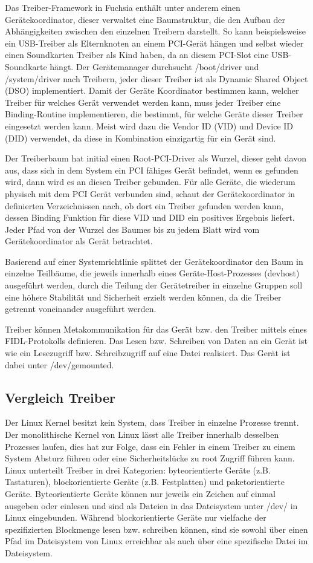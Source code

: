 \documentclass[a4paper]{scrartcl}
\begin{document}
Das Treiber-Framework in Fuchsia enthält unter anderem einen Gerätekoordinator, dieser verwaltet eine Baumstruktur, die den Aufbau der Abhängigkeiten zwischen den einzelnen Treibern darstellt. So kann beispielsweise ein USB-Treiber als Elternknoten an einem PCI-Gerät hängen und selbst wieder einen Soundkarten Treiber als Kind haben, da an diesem PCI-Slot eine USB-Soundkarte hängt. Der Gerätemanager durchsucht /boot/driver und /system/driver nach Treibern, jeder dieser Treiber ist als Dynamic Shared Object (DSO) implementiert. Damit der Geräte Koordinator bestimmen kann, welcher Treiber für welches Gerät verwendet werden kann, muss jeder Treiber eine Binding-Routine implementieren, die bestimmt, für welche Geräte dieser Treiber eingesetzt werden kann. Meist wird dazu die Vendor ID (VID) und Device ID (DID) verwendet, da diese in Kombination einzigartig für ein Gerät sind. 

Der Treiberbaum hat initial einen Root-PCI-Driver als Wurzel, dieser geht davon aus, dass sich in dem System ein PCI fähiges Gerät befindet, wenn es gefunden wird, dann wird es an diesen Treiber gebunden. Für alle Geräte, die wiederum physisch mit dem PCI Gerät verbunden sind, schaut der Gerätekoordinator in definierten Verzeichnissen nach, ob dort ein Treiber gefunden werden kann, dessen Binding Funktion für diese VID und DID ein positives Ergebnis liefert. Jeder Pfad von der Wurzel des Baumes bis zu jedem Blatt wird vom Gerätekoordinator als Gerät betrachtet.

Basierend auf einer Systemrichtlinie splittet der Gerätekoordinator den Baum in einzelne Teilbäume, die jeweils innerhalb eines Geräte-Host-Prozesses (devhost) ausgeführt werden, durch die Teilung der Gerätetreiber in einzelne Gruppen soll eine höhere Stabilität und Sicherheit erzielt werden können, da die Treiber getrennt voneinander ausgeführt werden.

Treiber können Metakommunikation für das Gerät bzw. den Treiber mittels eines FIDL-Protokolls definieren. Das Lesen bzw. Schreiben von Daten an ein Gerät ist wie ein Lesezugriff bzw. Schreibzugriff auf eine Datei realisiert. Das Gerät ist dabei unter /dev/gemounted.
\subsection{Vergleich Treiber}
Der Linux Kernel besitzt kein System, dass Treiber in einzelne Prozesse trennt. Der monolithische Kernel von Linux lässt alle Treiber innerhalb desselben Prozesses laufen, dies hat zur Folge, dass ein Fehler in einem Treiber zu einem System Absturz führen oder eine Sicherheitslücke zu root Zugriff führen kann. Linux unterteilt Treiber in drei Kategorien: byteorientierte Geräte (z.B. Tastaturen), blockorientierte Geräte (z.B. Festplatten) und paketorientierte Geräte. Byteorientierte Geräte können nur jeweils ein Zeichen auf einmal ausgeben oder einlesen und sind als Dateien in das Dateisystem unter /dev/ in Linux eingebunden. Während blockorientierte Geräte nur vielfache der spezifizierten Blockmenge lesen bzw. schreiben können, sind sie sowohl über einen Pfad im Dateisystem von Linux erreichbar als auch über eine spezifische Datei im Dateisystem. 
\end{document}
